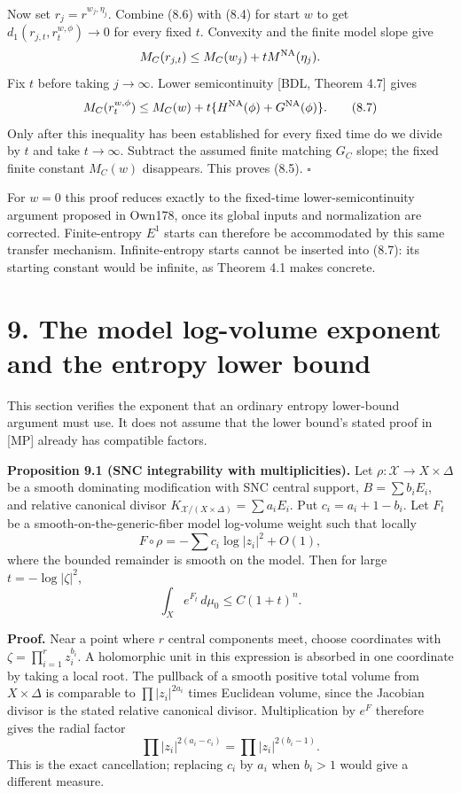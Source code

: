 \documentclass[
  11pt,
]{article}
\begin{document}
Now set \(r_j=r^{w_j,\eta_j}\). Combine (8.6) with (8.4) for start \(w\)
to get \(d_1(r_{j,t},r_t^{w,\phi})\to0\) for every fixed \(t\).
Convexity and the finite model slope give \[
 M_C(r_{j,t})\leq M_C(w_j)+tM^{\rm NA}(\eta_j).
\] Fix \(t\) before taking \(j\to\infty\). Lower semicontinuity {[}BDL,
Theorem 4.7{]} gives \[
 M_C(r_t^{w,\phi})
   \leq M_C(w)+t\{H^{\rm NA}(\phi)+G^{\rm NA}(\phi)\}.
                                                               \tag{8.7}
\] Only after this inequality has been established for every fixed time
do we divide by \(t\) and take \(t\to\infty\). Subtract the assumed
finite matching \(G_C\) slope; the fixed finite constant \(M_C(w)\)
disappears. This proves (8.5). \(\square\)

For \(w=0\) this proof reduces exactly to the fixed-time
lower-semicontinuity argument proposed in Own178, once its global inputs
and normalization are corrected. Finite-entropy \(E^1\) starts can
therefore be accommodated by this same transfer mechanism.
Infinite-entropy starts cannot be inserted into (8.7): its starting
constant would be infinite, as Theorem 4.1 makes concrete.

\section{9. The model log-volume exponent and the entropy lower
bound}\label{the-model-log-volume-exponent-and-the-entropy-lower-bound}

This section verifies the exponent that an ordinary entropy lower-bound
argument must use. It does not assume that the lower bound's stated
proof in {[}MP{]} already has compatible factors.

\textbf{Proposition 9.1 (SNC integrability with multiplicities).} Let
\(\rho:\mathcal X\to X\times\Delta\) be a smooth dominating modification
with SNC central support, \(B=\sum b_iE_i\), and relative canonical
divisor \(K_{\mathcal X/(X\times\Delta)}=\sum a_iE_i\). Put
\(c_i=a_i+1-b_i\). Let \(F_t\) be a smooth-on-the-generic-fiber model
log-volume weight such that locally \[
 F\circ\rho=-\sum c_i\log|z_i|^2+O(1),                    \tag{9.1}
\] where the bounded remainder is smooth on the model. Then for large
\(t=-\log|\zeta|^2\), \[
 \int_Xe^{F_t}\,d\mu_0\leq C(1+t)^n.                     \tag{9.2}
\]

\textbf{Proof.} Near a point where \(r\) central components meet, choose
coordinates with \(\zeta=\prod_{i=1}^rz_i^{b_i}\). A holomorphic unit in
this expression is absorbed in one coordinate by taking a local root.
The pullback of a smooth positive total volume from \(X\times\Delta\) is
comparable to \(\prod|z_i|^{2a_i}\) times Euclidean volume, since the
Jacobian divisor is the stated relative canonical divisor.
Multiplication by \(e^F\) therefore gives the radial factor \[
 \prod|z_i|^{2(a_i-c_i)}=\prod|z_i|^{2(b_i-1)}.
                                                               \tag{9.3}
\] This is the exact cancellation; replacing \(c_i\) by \(a_i\) when
\(b_i>1\) would give a different measure.
\end{document}
